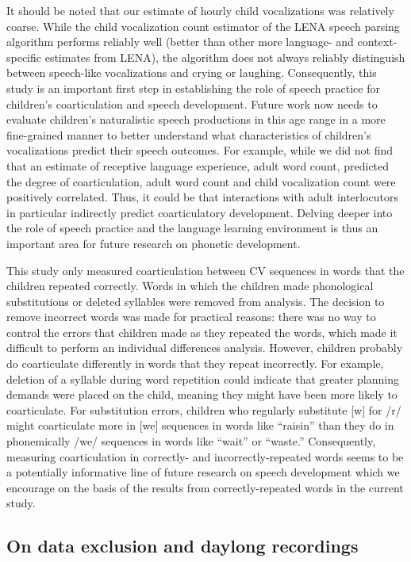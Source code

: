 \documentclass[a4paper,man,natbib,donotrepeattitle, apacite]{apa6}
\begin{document}
It should be noted that our estimate of hourly child vocalizations was relatively coarse. While the child vocalization count estimator of the LENA speech parsing algorithm performs reliably well \cite{cristiaThoroughEvaluationLanguage2020} (better than other more language- and context-specific estimates from LENA), the algorithm does not always reliably distinguish between speech-like vocalizations and crying or laughing. Consequently, this study is an important first step in establishing the role of speech practice for children’s coarticulation and speech development. Future work now needs to evaluate children’s naturalistic speech productions in this age range in a more fine-grained manner to better understand what characteristics of children’s vocalizations predict their speech outcomes. For example, while we did not find that an estimate of receptive language experience, adult word count, predicted the degree of coarticulation, adult word count and child vocalization count were positively correlated. Thus, it could be that interactions with adult interlocutors in particular indirectly predict coarticulatory development. Delving deeper into the role of speech practice and the language learning environment is thus an important area for future research on phonetic development. 

This study only measured coarticulation between CV sequences in words that the children repeated correctly. Words in which the children made phonological substitutions or deleted syllables were removed from analysis. The decision to remove incorrect words was made for practical reasons: there was no way to control the errors that children made as they repeated the words, which made it difficult to perform an individual differences analysis. However, children probably do coarticulate differently in words that they repeat incorrectly. For example, deletion of a syllable during word repetition could indicate that greater planning demands were placed on the child, meaning they might have been more likely to coarticulate. For substitution errors, children who regularly substitute [w] for /r/ might coarticulate more in [we] sequences in words like ``raisin'' than they do in phonemically /we/ sequences in words like ``wait'' or ``waste.'' Consequently, measuring coarticulation in correctly- and incorrectly-repeated words seems to be a potentially informative line of future research on speech development which we encourage on the basis of the results from correctly-repeated words in the current study. 

\subsection{On data exclusion and daylong recordings}
\end{document}
